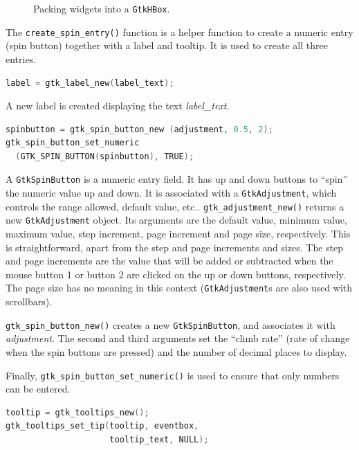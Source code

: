 \documentclass[a4paper,oneside]{article}
\newcommand{\variable}[1]{\textsl{#1}}
\newcommand{\class}[1]{\texttt{#1}}
\newcommand{\function}[1]{\texttt{#1()}}
\begin{document}
\begin{figure}
  \centering {}
  \caption[Packing widgets into a \class{GtkHBox}]{Packing widgets
    into a \class{GtkHBox}.}
  \label{fig:boxpacking}
\end{figure}

The \function{create\_spin\_entry} function is a helper function to
create a numeric entry (spin button) together with a label and
tooltip.  It is used to create all three entries.

\begin{lstlisting}[numbers=none, language=C]
label = gtk_label_new(label_text);
\end{lstlisting}

A new label is created displaying the text \variable{label\_text}.

\begin{lstlisting}[numbers=none, language=C]
spinbutton = gtk_spin_button_new (adjustment, 0.5, 2);
gtk_spin_button_set_numeric
  (GTK_SPIN_BUTTON(spinbutton), TRUE);
\end{lstlisting}

A \class{GtkSpinButton} is a numeric entry field.  It has up and down
buttons to ``spin'' the numeric value up and down.  It is associated
with a \class{GtkAdjustment}, which controls the range allowed,
default value, etc..  \function{gtk\_adjustment\_new} returns a new
\class{GtkAdjustment} object.  Its arguments are the default value,
minimum value, maximum value, step increment, page increment and page
size, respectively.  This is straightforward, apart from the step and
page increments and sizes.  The step and page increments are the value
that will be added or subtracted when the mouse button 1 or button 2
are clicked on the up or down buttons, respectively.  The page size
has no meaning in this context (\class{GtkAdjustment}s are also used
with scrollbars).

\function{gtk\_spin\_button\_new} creates a new \class{GtkSpinButton},
and associates it with \variable{adjustment}.  The second and third
arguments set the ``climb rate'' (rate of change when the spin buttons
are pressed) and the number of decimal places to display.

Finally, \function{gtk\_spin\_button\_set\_numeric} is used to ensure
that only numbers can be entered.

\begin{lstlisting}[numbers=none, language=C]
tooltip = gtk_tooltips_new();
gtk_tooltips_set_tip(tooltip, eventbox,
                     tooltip_text, NULL);
\end{lstlisting}
\end{document}
